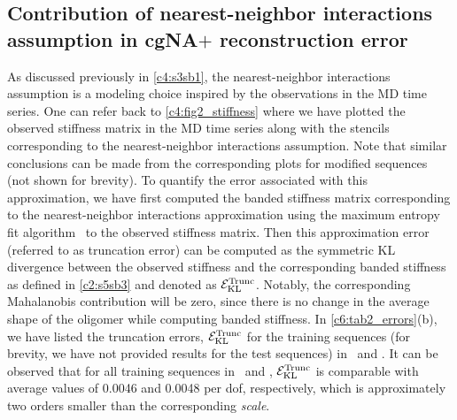 \subsection{Contribution of nearest-neighbor interactions assumption in cgNA$+$ reconstruction error}\label{c6:nearest_neigh_err_sec}
As discussed previously in \cref{c4:s3sb1}, the nearest-neighbor interactions assumption is a modeling choice inspired by the observations in the MD time series.
One can refer back to \cref{c4:fig2_stiffness} where we have plotted the observed stiffness matrix in the MD time series along with the stencils corresponding to the nearest-neighbor interactions assumption.
Note that similar conclusions can be made from the corresponding plots for modified sequences (not shown for brevity).
To quantify the error associated with this approximation, we have first computed the banded stiffness matrix corresponding to the nearest-neighbor interactions approximation using the maximum entropy fit algorithm~\cite{glowackithesis} to the observed stiffness matrix.
Then this approximation error (referred to as truncation error) can be computed as the symmetric KL divergence between the observed stiffness and the corresponding banded stiffness as defined in \cref{c2:s5sb3} and denoted as ${\mathcal E}_{\text{KL}}^{\text{Trunc}}$. 
Notably, the corresponding Mahalanobis contribution will be zero, since there is no change in the average shape of the oligomer while computing banded stiffness.
In \cref{c6:tab2_errors}(b), we have listed the truncation errors, ${\mathcal E}_{\text{KL}}^{\text{Trunc}}$ for the training sequences (for brevity, we have not provided results for the test sequences) in \Lbm \ and \Lbh. 
It can be observed that for all training sequences in \Lbm \ and \Lbh, ${\mathcal E}_{\text{KL}}^{\text{Trunc}}$ is comparable with average values of 0.0046 and 0.0048 per dof, respectively, which is approximately two orders smaller than the corresponding \textit{scale}. 


